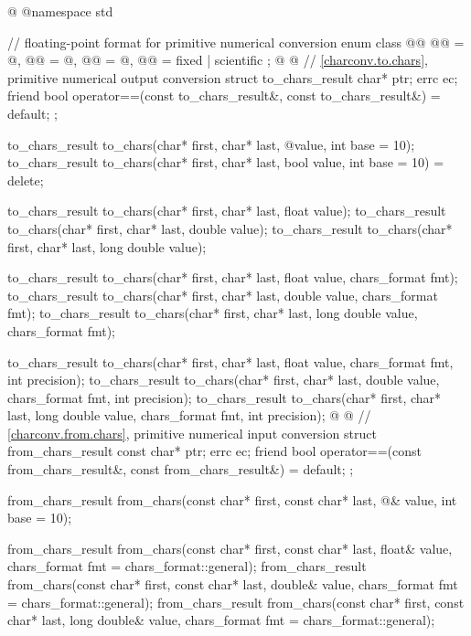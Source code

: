 %
\begin{codeblock}
@%
@namespace std {
  // floating-point format for primitive numerical conversion
  enum class @@ {
    @@ = @\unspec@,
    @@ = @\unspec@,
    @@ = @\unspec@,
    @@ = fixed | scientific
  };
@%
%
%
@
  // \ref{charconv.to.chars}, primitive numerical output conversion
  struct to_chars_result {
    char* ptr;
    errc ec;
    friend bool operator==(const to_chars_result&, const to_chars_result&) = default;
  };

  to_chars_result to_chars(char* first, char* last, @\seebelow@ value, int base = 10);
  to_chars_result to_chars(char* first, char* last, bool value, int base = 10) = delete;

  to_chars_result to_chars(char* first, char* last, float value);
  to_chars_result to_chars(char* first, char* last, double value);
  to_chars_result to_chars(char* first, char* last, long double value);

  to_chars_result to_chars(char* first, char* last, float value, chars_format fmt);
  to_chars_result to_chars(char* first, char* last, double value, chars_format fmt);
  to_chars_result to_chars(char* first, char* last, long double value, chars_format fmt);

  to_chars_result to_chars(char* first, char* last, float value,
                           chars_format fmt, int precision);
  to_chars_result to_chars(char* first, char* last, double value,
                           chars_format fmt, int precision);
  to_chars_result to_chars(char* first, char* last, long double value,
                           chars_format fmt, int precision);
@%
%
%
@
  // \ref{charconv.from.chars}, primitive numerical input conversion
  struct from_chars_result {
    const char* ptr;
    errc ec;
    friend bool operator==(const from_chars_result&, const from_chars_result&) = default;
  };

  from_chars_result from_chars(const char* first, const char* last,
                               @\seebelow@& value, int base = 10);

  from_chars_result from_chars(const char* first, const char* last, float& value,
                               chars_format fmt = chars_format::general);
  from_chars_result from_chars(const char* first, const char* last, double& value,
                               chars_format fmt = chars_format::general);
  from_chars_result from_chars(const char* first, const char* last, long double& value,
                               chars_format fmt = chars_format::general);
}
\end{codeblock}

